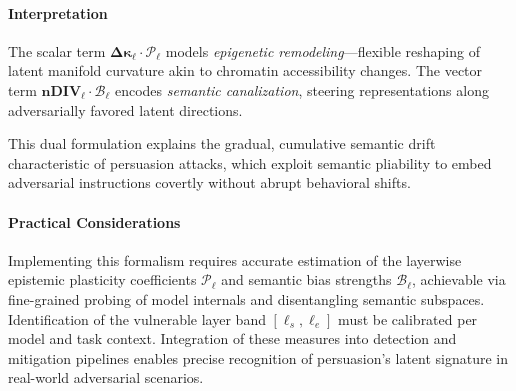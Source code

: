 \paragraph{\textbf{Interpretation}}

The scalar term \(\boldsymbol{\Delta \kappa_\ell} \cdot \boldsymbol{\mathcal{P}_\ell}\) models \emph{epigenetic remodeling}—flexible reshaping of latent manifold curvature akin to chromatin accessibility changes. The vector term \(\mathbf{nDIV_\ell} \cdot \boldsymbol{\mathcal{B}_\ell}\) encodes \emph{semantic canalization}, steering representations along adversarially favored latent directions.

This dual formulation explains the gradual, cumulative semantic drift characteristic of persuasion attacks, which exploit semantic pliability to embed adversarial instructions covertly without abrupt behavioral shifts.

\vspace{0.5em}
\paragraph{\textbf{Practical Considerations}}

Implementing this formalism requires accurate estimation of the layerwise epistemic plasticity coefficients \(\boldsymbol{\mathcal{P}_\ell}\) and semantic bias strengths \(\boldsymbol{\mathcal{B}_\ell}\), achievable via fine-grained probing of model internals and disentangling semantic subspaces. Identification of the vulnerable layer band \([\ell_s, \ell_e]\) must be calibrated per model and task context. Integration of these measures into detection and mitigation pipelines enables precise recognition of persuasion’s latent signature in real-world adversarial scenarios.








